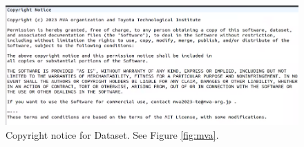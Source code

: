 \begin{figure}[!h]
  \centering
  \includegraphics[width=\textwidth]{figures/permission-mva.png}
  \caption*{Copyright notice for \textcite{mva2023} Dataset. See Figure \ref{fig:mva}.}
\end{figure}
